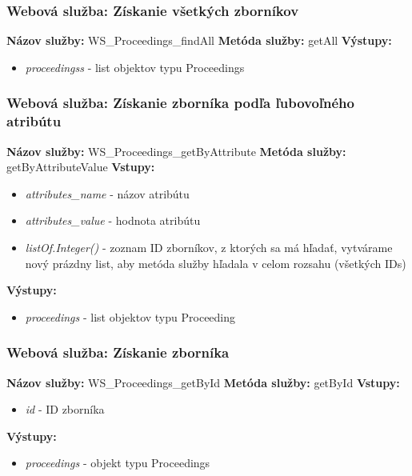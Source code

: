 \documentclass[10pt,oneside,slovak,a4paper]{article}
\begin{document}
\subsubsection{Webová služba: Získanie všetkých zborníkov}
\textbf{Názov služby:} WS\_Proceedings\_findAll
\textbf{Metóda služby:} getAll
\textbf{Výstupy:}
	\begin{itemize}
		\item \textit{proceedingss} - list objektov typu Proceedings
	\end{itemize}
	
\subsubsection{Webová služba: Získanie zborníka podľa ľubovoľného atribútu}
\textbf{Názov služby:} WS\_Proceedings\_getByAttribute
\textbf{Metóda služby:} getByAttributeValue
\textbf{Vstupy:}
	\begin{itemize}
		\item \textit{attributes\_name} - názov atribútu
		\item \textit{attributes\_value} - hodnota atribútu
		\item \textit{listOf.Integer()} - zoznam ID zborníkov, z ktorých sa má hľadať, vytvárame nový prázdny list, aby metóda služby hľadala v celom rozsahu (všetkých IDs)
	\end{itemize}
\textbf{Výstupy:}
	\begin{itemize}
		\item \textit{proceedings} - list objektov typu Proceeding
	\end{itemize}
	
\subsubsection{Webová služba: Získanie zborníka}
\textbf{Názov služby:} WS\_Proceedings\_getById
\textbf{Metóda služby:} getById
\textbf{Vstupy:}
	\begin{itemize}
		\item \textit{id} - ID zborníka
	\end{itemize}
\textbf{Výstupy:}
	\begin{itemize}
		\item \textit{proceedings} - objekt typu Proceedings
	\end{itemize}
	
\end{document}
